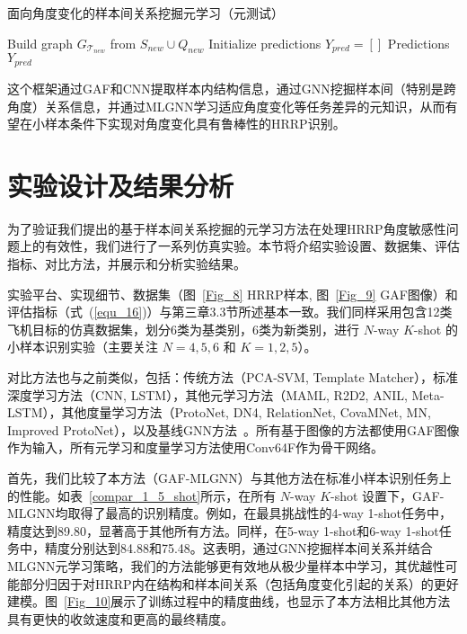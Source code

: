 \begin{algorithm}[h!]
\SetAlgoLined
\DontPrintSemicolon
\caption{面向角度变化的样本间关系挖掘元学习（元测试）}
\label{alg:meta_testing_angle}

Build graph $G_{\mathcal{T}_{new}}$ from $S_{new} \cup Q_{new}$\;
Initialize predictions $Y_{pred} = []$\;
\Return Predictions $Y_{pred}$\;
\end{algorithm}

这个框架通过GAF和CNN提取样本内结构信息，通过GNN挖掘样本间（特别是跨角度）关系信息，并通过MLGNN学习适应角度变化等任务差异的元知识，从而有望在小样本条件下实现对角度变化具有鲁棒性的HRRP识别。

\section{实验设计及结果分析}
\label{sec:experiments_angle}

为了验证我们提出的基于样本间关系挖掘的元学习方法在处理HRRP角度敏感性问题上的有效性，我们进行了一系列仿真实验。本节将介绍实验设置、数据集、评估指标、对比方法，并展示和分析实验结果。

实验平台、实现细节、数据集（图~\ref{Fig_8} HRRP样本, 图~\ref{Fig_9} GAF图像）和评估指标（式~(\ref{equ_16})）与第三章3.3节所述基本一致。我们同样采用包含12类飞机目标的仿真数据集，划分6类为基类别，6类为新类别，进行 $N$-way $K$-shot 的小样本识别实验（主要关注 $N=4, 5, 6$ 和 $K=1, 2, 5$）。

对比方法也与之前类似，包括：传统方法（PCA-SVM, Template Matcher），标准深度学习方法（CNN, LSTM），其他元学习方法（MAML, R2D2, ANIL, Meta-LSTM），其他度量学习方法（ProtoNet, DN4, RelationNet, CovaMNet, MN, Improved ProtoNet），以及基线GNN方法~\cite{ref42}。所有基于图像的方法都使用GAF图像作为输入，所有元学习和度量学习方法使用Conv64F作为骨干网络。

首先，我们比较了本方法（GAF-MLGNN）与其他方法在标准小样本识别任务上的性能。如表~\ref{compar_1_5_shot}所示，在所有 $N$-way $K$-shot 设置下，GAF-MLGNN均取得了最高的识别精度。例如，在最具挑战性的4-way 1-shot任务中，精度达到89.80，显著高于其他所有方法。同样，在5-way 1-shot和6-way 1-shot任务中，精度分别达到84.88和75.48。这表明，通过GNN挖掘样本间关系并结合MLGNN元学习策略，我们的方法能够更有效地从极少量样本中学习，其优越性可能部分归因于对HRRP内在结构和样本间关系（包括角度变化引起的关系）的更好建模。图~\ref{Fig_10}展示了训练过程中的精度曲线，也显示了本方法相比其他方法具有更快的收敛速度和更高的最终精度。

